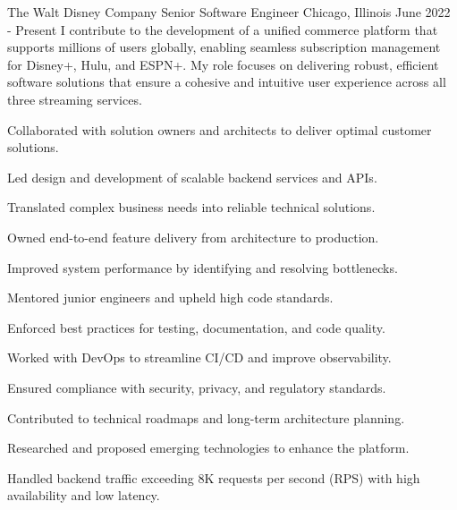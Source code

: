 
\begin{cventries}

  \experienceentry
  {The Walt Disney Company} %
    {Senior Software Engineer} %
    {Chicago, Illinois} %
    {June 2022 - Present} %
    {I contribute to the development of a unified commerce platform that supports millions of users globally, enabling seamless subscription management for Disney+, Hulu, and ESPN+. My role focuses on delivering robust, efficient software solutions that ensure a cohesive and intuitive user experience across all three streaming services.}
    {
      \begin{cvitems} %
      	\item {Collaborated with solution owners and architects to deliver optimal customer solutions.}
      	\item {Led design and development of scalable backend services and APIs.}
		\item {Translated complex business needs into reliable technical solutions.}
		\item {Owned end-to-end feature delivery from architecture to production.}
		\item {Improved system performance by identifying and resolving bottlenecks.}
		\item {Mentored junior engineers and upheld high code standards.}
		\item {Enforced best practices for testing, documentation, and code quality.}
		\item {Worked with DevOps to streamline CI/CD and improve observability.}
		\item {Ensured compliance with security, privacy, and regulatory standards.}
		\item {Contributed to technical roadmaps and long-term architecture planning.}
		\item {Researched and proposed emerging technologies to enhance the platform.}
		\item {Handled backend traffic exceeding 8K requests per second (RPS) with high availability and low latency.}

\end{cvitems}}
\end{cventries}
